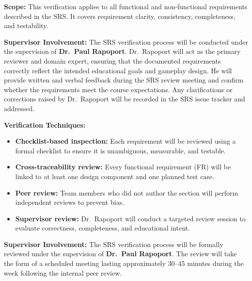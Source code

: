 \documentclass[12pt, titlepage]{article}
\begin{document}
\noindent \textbf{Scope:}  
This verification applies to all functional and non-functional requirements described in the SRS. It covers requirement clarity, consistency, completeness, and testability.  

\noindent \textbf{Supervisor Involvement:}  
The SRS verification process will be conducted under the supervision of \textbf{Dr.\ Paul Rapoport}.  
Dr.\ Rapoport will act as the primary reviewer and domain expert, ensuring that the documented requirements correctly reflect the intended educational goals and gameplay design.  
He will provide written and verbal feedback during the SRS review meeting and confirm whether the requirements meet the course expectations.  
Any clarifications or corrections raised by Dr.\ Rapoport will be recorded in the SRS issue tracker and addressed.

\noindent \textbf{Verification Techniques:}
\begin{itemize}
    \item \textbf{Checklist-based inspection:} Each requirement will be reviewed using a formal checklist to ensure it is unambiguous, measurable, and testable.  
    \item \textbf{Cross-traceability review:} Every functional requirement (FR) will be linked to at least one design component and one planned test case.  
    \item \textbf{Peer review:} Team members who did not author the section will perform independent reviews to prevent bias.  
    \item \textbf{Supervisor review:} Dr.\ Rapoport will conduct a targeted review session to evaluate correctness, completeness, and educational intent.
\end{itemize}

\noindent\textbf{Supervisor Involvement:}  
The SRS verification process will be formally reviewed under the supervision of \textbf{Dr.\ Paul Rapoport}.  
The review will take the form of a scheduled meeting lasting approximately 30--45 minutes during the week following the internal peer review.  
\end{document}
